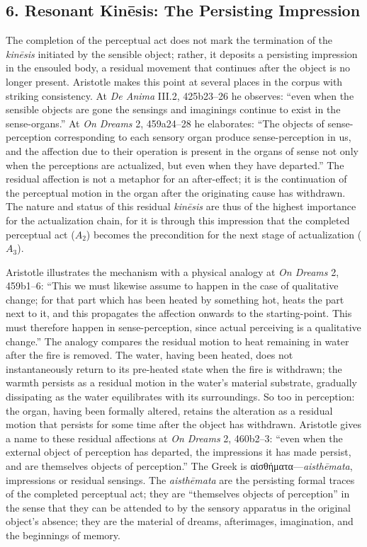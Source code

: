 \documentclass[12pt]{article}
\newcommand{\gk}[1]{\foreignlanguage{greek}{#1}}
\begin{document}
\subsection*{6. Resonant Kinēsis: The Persisting Impression}

The completion of the perceptual act does not mark the termination of the \textit{kinēsis} initiated by the sensible object; rather, it deposits a persisting impression in the ensouled body, a residual movement that continues after the object is no longer present. Aristotle makes this point at several places in the corpus with striking consistency. At \textit{De Anima} III.2, 425b23--26 he observes: ``even when the sensible objects are gone the sensings and imaginings continue to exist in the sense-organs.'' At \textit{On Dreams} 2, 459a24--28 he elaborates: ``The objects of sense-perception corresponding to each sensory organ produce sense-perception in us, and the affection due to their operation is present in the organs of sense not only when the perceptions are actualized, but even when they have departed.'' The residual affection is not a metaphor for an after-effect; it is the continuation of the perceptual motion in the organ after the originating cause has withdrawn. The nature and status of this residual \textit{kinēsis} are thus of the highest importance for the actualization chain, for it is through this impression that the completed perceptual act ($A_2$) becomes the precondition for the next stage of actualization ($A_3$).

Aristotle illustrates the mechanism with a physical analogy at \textit{On Dreams} 2, 459b1--6: ``This we must likewise assume to happen in the case of qualitative change; for that part which has been heated by something hot, heats the part next to it, and this propagates the affection onwards to the starting-point. This must therefore happen in sense-perception, since actual perceiving is a qualitative change.'' The analogy compares the residual motion to heat remaining in water after the fire is removed. The water, having been heated, does not instantaneously return to its pre-heated state when the fire is withdrawn; the warmth persists as a residual motion in the water's material substrate, gradually dissipating as the water equilibrates with its surroundings. So too in perception: the organ, having been formally altered, retains the alteration as a residual motion that persists for some time after the object has withdrawn. Aristotle gives a name to these residual affections at \textit{On Dreams} 2, 460b2--3: ``even when the external object of perception has departed, the impressions it has made persist, and are themselves objects of perception.'' The Greek is \gk{αἰσθήματα}---\textit{aisthēmata}, impressions or residual sensings. The \textit{aisthēmata} are the persisting formal traces of the completed perceptual act; they are ``themselves objects of perception'' in the sense that they can be attended to by the sensory apparatus in the original object's absence; they are the material of dreams, afterimages, imagination, and the beginnings of memory.
\end{document}
